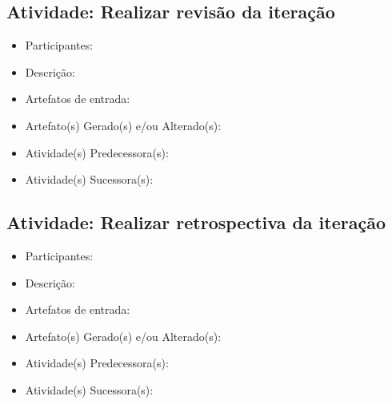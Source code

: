 \subsection{Atividade: Realizar revisão da iteração}
\begin{itemize}
\item Participantes: 

\item Descrição: 

\item Artefatos de entrada: 

\item Artefato(s) Gerado(s) e/ou Alterado(s): 

\item Atividade(s) Predecessora(s): 
  
\item Atividade(s) Sucessora(s): 
\end{itemize}

\subsection{Atividade: Realizar retrospectiva da iteração}
\begin{itemize}
\item Participantes: 

\item Descrição: 

\item Artefatos de entrada: 

\item Artefato(s) Gerado(s) e/ou Alterado(s): 

\item Atividade(s) Predecessora(s): 
  
\item Atividade(s) Sucessora(s): 
\end{itemize}

